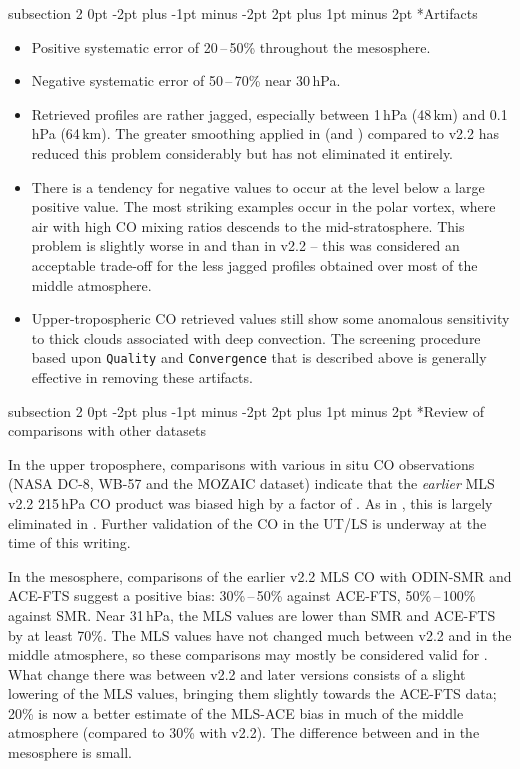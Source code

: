 \documentclass[11pt,draft]{report}
\makeatletter
\renewcommand{\subsection}{\@startsection%
  {subsection}%
  {2}%
  {0pt}%
  {-2pt plus -1pt minus -2pt}%
  {2pt plus 1pt minus 2pt}%
  {\large\sffamily\fontseries{sb}\selectfont\flushleft\color{SectionColor}\figureversion{tabular}}}%
\makeatother
\begin{document}
\subsection*{Artifacts}
\begin{itemize}
\item Positive systematic error of 20\,--\,50\% throughout the mesosphere.
\item Negative systematic error of 50\,--\,70\% near 30\,hPa.
\item Retrieved profiles are rather jagged, especially between 1\,hPa
  (48\,km) and 0.1\,hPa (64\,km). The greater smoothing applied in
  \thisv (and \prevvSlash) compared to v2.2 has reduced this problem
  considerably but has not eliminated it entirely.
\item There is a tendency for negative values to occur at the level
  below a large positive value. The most striking examples occur in the
  polar vortex, where air with high CO mixing ratios descends to the
  mid-stratosphere.  This problem is slightly worse in \thisv and
  \prevvSlash than in v2.2 -- this was considered an acceptable
  trade-off for the less jagged profiles obtained over most of the
  middle atmosphere.
\item Upper-tropospheric \thisv CO retrieved values still show some anomalous 
sensitivity to thick clouds associated with deep convection.  
The screening procedure based upon \texttt{Quality} and \texttt{Convergence} 
that is described above is generally effective in removing these artifacts.
\end{itemize}

\subsection*{Review of comparisons with other datasets}

In the upper troposphere, comparisons with various in situ CO
observations (NASA DC-8, WB-57 and the MOZAIC dataset) indicate that the
\emph{earlier} MLS v2.2 215\,hPa CO product was biased high by a factor
of . As in \prevv, this is largely eliminated in \thisv.
Further validation of the \thisv CO in the UT/LS is underway at the time
of this writing.

In the mesosphere, comparisons of the earlier v2.2 MLS CO with ODIN-SMR
and ACE-FTS suggest a positive bias: 30\%\,--\,50\% against ACE-FTS,
50\%\,--\,100\% against SMR. Near 31\,hPa, the MLS values are lower than
SMR and ACE-FTS by at least 70\%. The MLS values have not changed much
between v2.2 and \thisv in the middle atmosphere, so these comparisons
may mostly be considered valid for \thisv.  What change there was
between v2.2 and later versions consists of a slight lowering of the MLS
values, bringing them slightly towards the ACE-FTS data; 20\% is now a
better estimate of the MLS-ACE bias in much of the middle atmosphere
(compared to 30\% with v2.2). The difference between \prevvSlash and
\thisv in the mesosphere is small.
\end{document}
